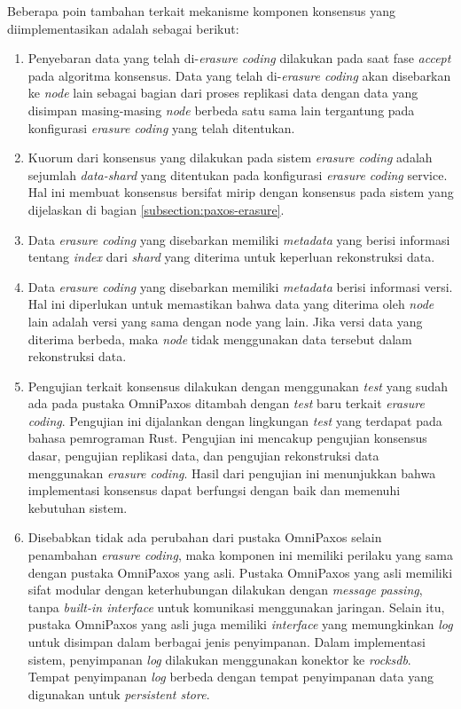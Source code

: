 Beberapa poin tambahan terkait mekanisme komponen konsensus yang diimplementasikan adalah sebagai berikut:
\begin{enumerate}
  \item Penyebaran data yang telah di-\textit{erasure coding} dilakukan pada saat fase \textit{accept} pada algoritma konsensus. Data yang telah di-\textit{erasure coding} akan disebarkan ke \textit{node} lain sebagai bagian dari proses replikasi data dengan data yang disimpan masing-masing \textit{node} berbeda satu sama lain tergantung pada konfigurasi \textit{erasure coding} yang telah ditentukan.
  \item Kuorum dari konsensus yang dilakukan pada sistem \textit{erasure coding} adalah sejumlah \textit{data-shard} yang ditentukan pada konfigurasi \textit{erasure coding} service. Hal ini membuat konsensus bersifat mirip dengan konsensus pada sistem yang dijelaskan di bagian \ref{subsection:paxos-erasure}.
  \item Data \textit{erasure coding} yang disebarkan memiliki \textit{metadata} yang berisi informasi tentang \textit{index} dari \textit{shard} yang diterima untuk keperluan rekonstruksi data.
  \item Data \textit{erasure coding} yang disebarkan memiliki \textit{metadata} berisi informasi versi. Hal ini diperlukan untuk memastikan bahwa data yang diterima oleh \textit{node} lain adalah versi yang sama dengan node yang lain. Jika versi data yang diterima berbeda, maka \textit{node} tidak menggunakan data tersebut dalam rekonstruksi data.
  \item Pengujian terkait konsensus dilakukan dengan menggunakan \textit{test} yang sudah ada pada pustaka OmniPaxos ditambah dengan \textit{test} baru terkait \textit{erasure coding}. Pengujian ini dijalankan dengan lingkungan \textit{test} yang terdapat pada bahasa pemrograman Rust. Pengujian ini mencakup pengujian konsensus dasar, pengujian replikasi data, dan pengujian rekonstruksi data menggunakan \textit{erasure coding}. Hasil dari pengujian ini menunjukkan bahwa implementasi konsensus dapat berfungsi dengan baik dan memenuhi kebutuhan sistem.
  \item Disebabkan tidak ada perubahan dari pustaka OmniPaxos selain penambahan \textit{erasure coding}, maka komponen ini memiliki perilaku yang sama dengan pustaka OmniPaxos yang asli. Pustaka OmniPaxos yang asli memiliki sifat modular dengan keterhubungan dilakukan dengan \textit{message passing}, tanpa \textit{built-in interface} untuk komunikasi menggunakan jaringan. Selain itu, pustaka OmniPaxos yang asli juga memiliki \textit{interface} yang memungkinkan \textit{log} untuk disimpan dalam berbagai jenis penyimpanan. Dalam implementasi sistem, penyimpanan \textit{log} dilakukan menggunakan konektor ke \textit{rocksdb}. Tempat penyimpanan \textit{log} berbeda dengan tempat penyimpanan data yang digunakan untuk \textit{persistent store}.
\end{enumerate}

